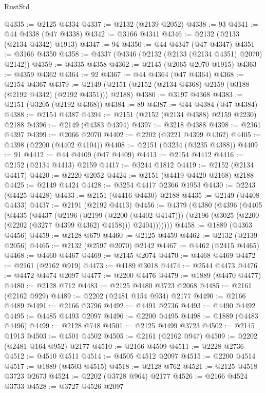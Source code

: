 \begin{lexlean}{RustStd}
\begin{coremodule}
@4335 := @2125 @4334
@4337 := @2132 (@2139 @2052)
@4338 := 93
@4341 := @44 @4338 (@47 @4338)
@4342 := @3166 @4341
@4346 := @2132 (@2133 (@2134 @4342) @1913)
@4347 := 94
@4350 := @44 @4347 (@47 @4347)
@4351 := @3166 @4350
@4358 := @4337 (@4346 (@2132 (@2133 (@2134 @4351) @2070) @2142))
@4359 := @4335 @4358
@4362 := @2145 (@2065 @2070 @1915)
@4363 := @4359 @4362
@4364 := 92
@4367 := @44 @4364 (@47 @4364)
@4368 := @2154 @4367
@4379 := @2149 (@2151 (@2152 (@2134 @4368) @2159 (@3188 (@2192 @4342) (@2192 @4351))) @2188)
@4380 := @3197 @4368
@4383 := @2151 (@3205 (@2192 @4368))
@4384 := 89
@4387 := @44 @4384 (@47 @4384)
@4388 := @2154 @4387
@4394 := @2151 (@2152 (@2134 @4388) @2159 @2230) @2188
@4396 := @2149 (@4383 @4394)
@4397 := @3218 @4388
@4398 := @2361 @4397
@4399 := @2066 @2070
@4402 := @2202 (@3221 @4399 @4362)
@4405 := @4398 (@2200 (@4402 @4104))
@4408 := @2151 (@3234 (@3235 @4388))
@4409 := 91
@4412 := @44 @4409 (@47 @4409)
@4413 := @2154 @4412
@4416 := @2152 (@2134 @4413) @2159
@4417 := @3244 @1812
@4419 := @2152 (@2134 @4417)
@4420 := @2220 @2052
@4424 := @2151 (@4419 @4420 @2168) @2188
@4425 := @2149 @4424
@4428 := @3254 @4417 @2366 @1953
@4430 := @2243 (@4425 @4428)
@4433 := @2151 (@4416 @4430) @2188
@4435 := @2149 (@4408 @4433)
@4437 := @2191 (@2192 @4413)
@4456 := @4379
    (@4380
      (@4396
        (@4405
          (@4435
            (@4437
              (@2196
                (@2199 (@2200 (@4402 @4147)))
                (@2196 (@3025 (@2200 (@2202 (@3277 @4399 @4362) @4158))) @2404)))))))
@4458 := @1889 (@4363 @4456)
@4459 := @2128 @679
@4460 := @2125 @4459
@4462 := @2132 (@2139 @2056)
@4465 := @2132 (@2597 @2070) @2142
@4467 := @4462 (@2415 @4465)
@4468 := @4460 @4467
@4469 := @2145 @2074
@4470 := @4468 @4469
@4472 := @2161 (@2162 @919)
@4473 := @4189 @3018
@4474 := @2544 @4473
@4476 := @4472 @4474 @2097
@4477 := @2200 @4476
@4479 := @1889 (@4470 @4477)
@4480 := @2128 @712
@4483 := @2125 @4480 @3723 @2068
@4485 := @2161 (@2162 @929)
@4489 := @2202 (@2481 @154 @934) @2177
@4490 := @2166 @4489
@4491 := @2166 @3796
@4492 := @4491 @2736
@4493 := @4490 @4492
@4495 := @4485 @4493 @2097
@4496 := @2200 @4495
@4498 := @1889 (@4483 @4496)
@4499 := @2128 @748
@4501 := @2125 @4499 @3723
@4502 := @2145 @1913
@4503 := @4501 @4502
@4505 := @2161 (@2162 @947)
@4509 := @2202 (@2481 @164 @952) @2177
@4510 := @2166 @4509
@4511 := @2228 @2736
@4512 := @4510 @4511
@4514 := @4505 @4512 @2097
@4515 := @2200 @4514
@4517 := @1889 (@4503 @4515)
@4518 := @2128 @762
@4521 := @2125 @4518 @3723 @2673
@4524 := @2202 (@3728 @964) @2177
@4526 := @2166 @4524 @3733
@4528 := @3727 @4526 @2097

\end{coremodule}
\end{lexlean}
